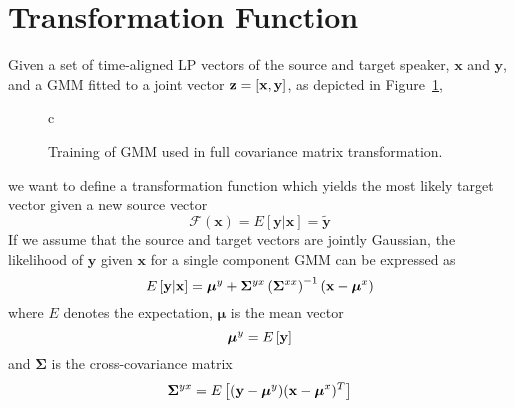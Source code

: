 \section{Transformation Function} %
\label{sec:transformation_function}
Given a set of time-aligned LP vectors of the source and target speaker, $\mathbf{x}$ and $\mathbf{y}$, and a GMM fitted to a joint vector $\mathbf{z}=\left[\mathbf{x},\mathbf{y}\right]$, as depicted in Figure~\ref{fig:VC_training_full},
\begin{figure}[htbp]
	\centering
	\begin{tabular}[h]{c}
	\end{tabular}
	\caption{Training of GMM used in full covariance matrix transformation.}
	\label{fig:VC_training_full}
\end{figure}
we want to define a transformation function which yields the most likely target vector given a new source vector
\newcommand{\fff}{\mathcal F}
\begin{equation}
	\fff(\mathbf{x}) = E[\mathbf{y}\vert \mathbf{x}] = \mathbf{\tilde{y}}
\end{equation}
If we assume that the source and target vectors are jointly Gaussian, the likelihood of $\mathbf{y}$ given $\mathbf{x}$ for a single component GMM can be expressed as \cite{kay93}
\begin{equation}
	E \left[\mathbf{y}\vert \mathbf{x}\right] = \boldsymbol{\mu}^y + \mathbf{\Sigma}^{yx} \left(\mathbf{\Sigma}^{xx}\right)^{-1} (\mathbf{x}-\boldsymbol{\mu}^x)
\end{equation}
where $E$ denotes the expectation, $\boldsymbol{\mu}$ is the mean vector
\begin{equation}
	\boldsymbol{\mu}^y = E\left[\mathbf{y}\right]
\end{equation}
and $\mathbf{\Sigma}$ is the cross-covariance matrix
\begin{equation}
	\mathbf{\Sigma}^{yx} = E \left[(\mathbf{y}-\boldsymbol{\mu}^y)(\mathbf{x}-\boldsymbol{\mu}^x)^T\right]
\end{equation}

